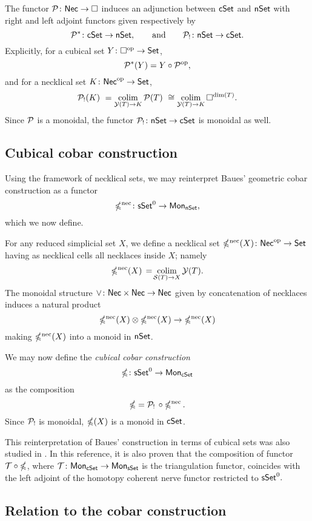 The functor $\mathcal{P} \colon \mathsf{Nec} \to \square$ induces an adjunction between $\mathsf{cSet}$ and $\mathsf{nSet}$ with right and left adjoint functors given respectively by
\[
\mathcal{P}^\ast \colon \mathsf{cSet} \to \mathsf{nSet},
\qquad \text{and} \qquad
\mathcal{P}_{!} \colon \mathsf{nSet} \to \mathsf{cSet}.
\]
Explicitly, for a cubical set $Y \colon \square^{\mathrm{op}} \to \mathsf{Set}$,
\[
\mathcal{P}^\ast(Y)= Y \circ \mathcal{P}^{\mathrm{op}},
\]
and for a necklical set $K \colon \mathsf{Nec}^{\mathrm{op}} \to \mathsf{Set}$,
\[
\mathcal{P}_{!}(K) \ =
\operatorname*{colim}_{\mathcal{Y}(T) \to K} \mathcal{P}(T) \ \cong
\operatorname*{colim}_{\mathcal{Y}(T) \to K} \square^{\dim(T)}.
\]
Since $\mathcal{P}$ is a monoidal, the functor $\mathcal{P}_{!} \colon \mathsf{nSet} \to \mathsf{cSet}$ is monoidal as well.

\subsection{Cubical cobar construction}\label{ss:cubical cobar}

Using the framework of necklical sets, we may reinterpret Baues' geometric cobar construction \cite{baues1980geometry} as a functor
\[
\operatorname{\mathbb{\Omega}^{\mathrm{nec}}} \colon \mathsf{sSet}^0 \to \mathsf{Mon}_{\mathsf{nSet}},
\]
which we now define.

For any reduced simplicial set $X$, we define a necklical set $\operatorname{\mathbb{\Omega}^{\mathrm{nec}}}(X) \colon \mathsf{Nec}^{\mathrm{op}} \to \mathsf{Set}$ having as necklical cells all necklaces inside $X$; namely
\[
\operatorname{\mathbb{\Omega}^{\mathrm{nec}}}(X) \, = \! \operatorname*{colim}_{\mathcal{S}(T) \to X} \mathcal{Y}(T).
\]
The monoidal structure $\vee \colon \mathsf{Nec} \times \mathsf{Nec} \to \mathsf{Nec}$ given by concatenation of necklaces induces a natural product
\[
\operatorname{\mathbb{\Omega}^{\mathrm{nec}}}(X) \otimes \operatorname{\mathbb{\Omega}^{\mathrm{nec}}}(X) \to \operatorname{\mathbb{\Omega}^{\mathrm{nec}}}(X)
\]
making $\operatorname{\mathbb{\Omega}^{\mathrm{nec}}}(X)$ into a monoid in $\mathsf{nSet}$.

We may now define the \textit{cubical cobar construction}
\[
\operatorname{\mathbb{\Omega}} \colon \mathsf{sSet}^0 \to \mathsf{Mon}_{\mathsf{cSet}}
\]
as the composition
\[
\operatorname{\mathbb{\Omega}} = \mathcal{P}_! \, \circ \operatorname{\mathbb{\Omega}^{\mathrm{nec}}}.
\]
Since $\mathcal{P}_!$ is monoidal, $\operatorname{\mathbb{\Omega}}(X)$ is a monoid in $\mathsf{cSet}$.

\begin{remark}
	This reinterpretation of Baues' construction in terms of cubical sets was also studied in \cite{rivera2018cubical}.
	In this reference, it is also proven that the composition of functor $\mathcal{T} \circ \operatorname{\mathbb{\Omega}}$, where $\mathcal{T} \colon \mathsf{Mon}_{\mathsf{cSet}} \to \mathsf{Mon}_{\mathsf{sSet}}$ is the triangulation functor, coincides with the left adjoint of the homotopy coherent nerve functor restricted to $\mathsf{sSet}^0.$
\end{remark}

\subsection{Relation to the cobar construction}

